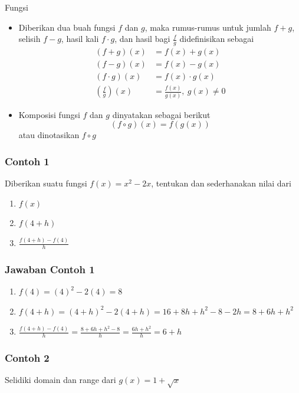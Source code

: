 \documentclass[pdflatex,compress,mathserif]{beamer}
\begin{document}
		\begin{frame}{Fungsi}
			\begin{itemize}
				\item Diberikan dua buah fungsi $ f $ dan $ g $, maka rumus-rumus untuk jumlah $ f+g $, selisih $ f-g $, hasil kali $ f \cdot g $, dan hasil bagi $ \frac{f}{g} $ didefinisikan sebagai
				\begin{align*}
					(f+g)(x) &= f(x) + g(x) \\
					(f-g)(x) &= f(x) - g(x) \\
					(f \cdot g)(x) &= f(x) \cdot g(x) \\
					\left( \frac{f}{g} \right)(x) &= \frac{f(x)}{g(x)},~g(x) \neq 0
				\end{align*}
				\item Komposisi fungsi $ f $ dan $ g $ dinyatakan sebagai berikut
				\begin{equation*}
					(f \circ g)(x) = f(g(x))
				\end{equation*}
				atau dinotasikan $ f \circ g $
			\end{itemize}
		\end{frame}
		
		\begin{frame}
			\frametitle{Contoh 1}
			Diberikan suatu fungsi $ f(x) = x^2 - 2x $, tentukan dan sederhanakan nilai dari
			\begin{enumerate}
				\item $ f(x) $
				\item $ f(4+h) $
				\item $\frac{f(4+h) - f(4)}{h}$
			\end{enumerate}
		\end{frame}
	
		\begin{frame}
			\frametitle{Jawaban Contoh 1}
			\begin{enumerate}
				\item $ f(4) = (4)^2 - 2(4) = 8 $
				\item $ f(4+h) = (4+h)^2 - 2(4+h) = 16 + 8h + h^2 - 8 - 2h = 8 + 6h + h^2 $
				\item $\frac{f(4+h) - f(4)}{h} = \frac{8 + 6h + h^2 - 8}{h} = \frac{6h+h^2}{h} = 6 + h$
			\end{enumerate}
		\end{frame}
	
		\begin{frame}
			\frametitle{Contoh 2}
			Selidiki domain dan range dari $ g(x) = 1 + \sqrt{x} $
		\end{frame}
	
\end{document}
